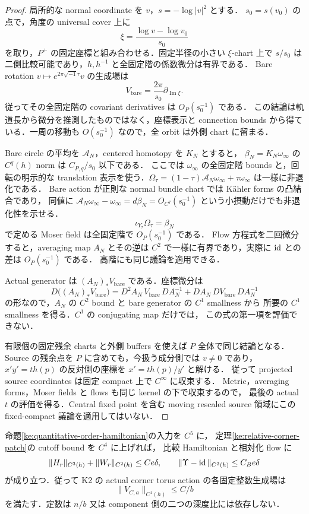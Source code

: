 \begin{proof}
局所的な normal coordinate を $v$，$s=-\log|v|^2$ とする．
$s_0=s(v_0)$ の点で，角度の universal cover 上に
\[
 \xi=\frac{\log v-\log v_0}{s_0}
\]
を取り，$P^+$ の固定座標と組み合わせる．固定半径の小さい $\xi$-chart 上で
$s/s_0$ は二側比較可能であり，$h,h^{-1}$ と全固定階の係数微分は有界である．
Bare rotation $v\mapsto e^{2\pi\sqrt{-1}\tau}v$ の生成場は
\[
 V_{\mathrm{bare}}=\frac{2\pi}{s_0}\partial_{\operatorname{Im}\xi}.
\]
従ってその全固定階の covariant derivatives は $O_P(s_0^{-1})$ である．
この結論は軌道長から微分を推測したものではなく，座標表示と connection bounds
から得ている．一周の移動も $O(s_0^{-1})$ なので，全 orbit は外側 chart に留まる．

Bare circle の平均を $\mathcal A_N$，centered homotopy を $K_N$ とすると，
$\beta_N=K_N\omega_\infty$ の $C^q(h)$ norm は
$C_{P,q}/s_0$ 以下である．
ここでは $\omega_\infty$ の全固定階 bounds と，回転の明示的な translation
表示を使う．$\Omega_\tau=(1-\tau)\mathcal A_N\omega_\infty+
\tau\omega_\infty$ は一様に非退化である．
Bare action が正則な normal bundle chart では K\"ahler forms の凸結合であり，
同値に $\mathcal A_N\omega_\infty-\omega_\infty=d\beta_N=O_{C^q}(s_0^{-1})$
という小摂動だけでも非退化性を示せる．
\[
 \iota_{Y_\tau}\Omega_\tau=\beta_N
\]
で定める Moser field は全固定階で $O_P(s_0^{-1})$ である．
Flow 方程式を二回微分すると，averaging map $A_N$ とその逆は
$C^2$ で一様に有界であり，実際に $\operatorname{id}$ との差は $O_P(s_0^{-1})$ である．
高階にも同じ議論を適用できる．

Actual generator は $(A_N)_*V_{\mathrm{bare}}$ である．座標微分は
\[
 D\bigl((A_N)_*V_{\mathrm{bare}}\bigr)
 =D^2A_N\,V_{\mathrm{bare}}\,DA_N^{-1}
   +DA_N\,DV_{\mathrm{bare}}\,DA_N^{-1}
\]
の形なので，$A_N$ の $C^2$ bound と bare generator の $C^1$ smallness から
所要の $C^1$ smallness を得る．$C^1$ の conjugating map だけでは，
この式の第一項を評価できない．

有限個の固定残余 charts と外側 buffers を使えば $P$ 全体で同じ結論となる．
Source の残余点を $P$ に含めても，今扱う成分側では $v\ne0$ であり，
$x'y'=t h(p)$ の反対側の座標を $x'=t h(p)/y'$ と解ける．
従って projected source coordinates は固定 compact 上で $C^\infty$ に収束する．
Metric，averaging forms，Moser fields と flows も同じ kernel の下で収束するので，
最後の actual $t$ の評価を得る．Central fixed point を含む moving rescaled
source 領域にこの fixed-compact 議論を適用してはいない．
\end{proof}

\begin{lemma}
\label{ke:relative-corner-patch-c2}
命題\ref{ke:quantitative-order-hamiltonian}の入力を $C^5$ に，
定理\ref{ke:relative-corner-patch}の cutoff bound を $C^4$ に上げれば，
比較 Hamiltonian と相対化 flow に
\[
 \|H_r\|_{C^3(h)}+\|W_r\|_{C^2(h)}\le Ce\delta,
 \qquad \|\Upsilon-\operatorname{id}\|_{C^2(h)}\le C_Be\delta
\]
が成り立つ．従って K2 の actual corner torus action の各固定整数生成場は
\[
 \|V_{C,a}\|_{C^1(h)}\le C/b
\]
を満たす．定数は $n/b$ 又は component 側の二つの深度比には依存しない．
\end{lemma}

